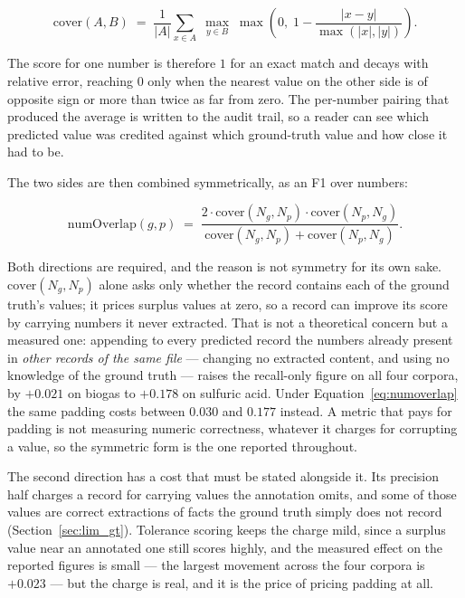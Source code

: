 \documentclass[11pt]{article}
\begin{document}
\begin{equation}
\label{eq:numcover}
\mathrm{cover}(A,B) \;=\; \frac{1}{|A|}\sum_{x \in A}\;\max_{y \in B}\;
\max\!\left(0,\; 1 - \frac{|x-y|}{\max(|x|,|y|)}\right).
\end{equation}

The score for one number is therefore $1$ for an exact match and decays with
relative error, reaching $0$ only when the nearest value on the other side is of
opposite sign or more than twice as far from zero. The per-number pairing that
produced the average is written to the audit trail, so a reader can see which
predicted value was credited against which ground-truth value and how close it
had to be.

The two sides are then combined symmetrically, as an F1 over numbers:

\begin{equation}
\label{eq:numoverlap}
\mathrm{numOverlap}(g,p) \;=\;
\frac{2 \cdot \mathrm{cover}(N_g,N_p) \cdot \mathrm{cover}(N_p,N_g)}
     {\mathrm{cover}(N_g,N_p) + \mathrm{cover}(N_p,N_g)}.
\end{equation}

Both directions are required, and the reason is not symmetry for its own sake.
$\mathrm{cover}(N_g,N_p)$ alone asks only whether the record contains each of the
ground truth's values; it prices surplus values at zero, so a record can improve
its score by carrying numbers it never extracted. That is not a theoretical
concern but a measured one: appending to every predicted record the numbers
already present in \emph{other records of the same file} --- changing no
extracted content, and using no knowledge of the ground truth --- raises the
recall-only figure on all four corpora, by $+0.021$ on biogas to $+0.178$ on
sulfuric acid. Under Equation~\ref{eq:numoverlap} the same padding costs between
$0.030$ and $0.177$ instead. A metric that pays for padding is not measuring
numeric correctness, whatever it charges for corrupting a value, so the
symmetric form is the one reported throughout.

The second direction has a cost that must be stated alongside it. Its precision
half charges a record for carrying values the annotation omits, and some of those
values are correct extractions of facts the ground truth simply does not record
(Section~\ref{sec:lim_gt}). Tolerance scoring keeps the charge mild, since a
surplus value near an annotated one still scores highly, and the measured effect
on the reported figures is small --- the largest movement across the four corpora
is $+0.023$ --- but the charge is real, and it is the price of pricing padding at
all.
\end{document}
